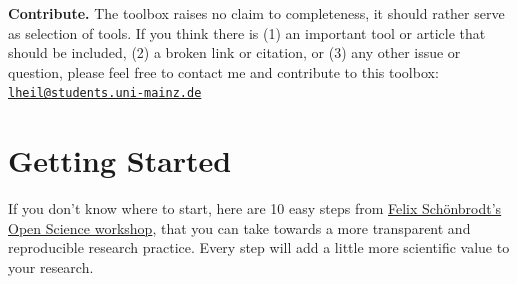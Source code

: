 \documentclass[12pt,]{report}
\begin{document}
\textbf{Contribute.} The toolbox raises no claim to completeness, it
should rather serve as selection of tools. If you think there is (1) an
important tool or article that should be included, (2) a broken link or
citation, or (3) any other issue or question, please feel free to
contact me and contribute to this toolbox:
\href{mailto:lheil@students.uni-mainz.de}{\nolinkurl{lheil@students.uni-mainz.de}}

\hypertarget{getting_started}{\chapter{Getting
Started}\label{getting_started}}

If you don't know where to start, here are 10 easy steps from
\href{https://osf.io/hjx5p/}{Felix Schönbrodt's Open Science workshop},
that you can take towards a more transparent and reproducible research
practice. Every step will add a little more scientific value to your
research.
\end{document}
